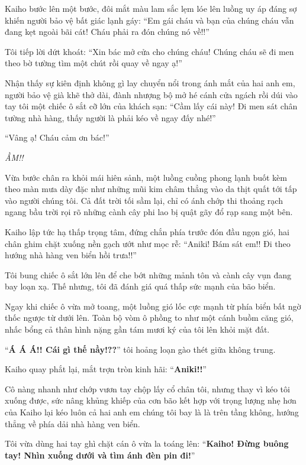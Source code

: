 \documentclass[../main.tex]{subfiles}
\begin{document}
Kaiho bước lên một bước, đôi mắt màu lam sắc lẹm lóe lên luồng uy áp đáng sợ khiến người bảo vệ bất giác lạnh gáy: ``Em gái cháu và bạn của chúng cháu vẫn đang kẹt ngoài bãi cát! Cháu phải ra đón chúng nó về!!''

Tôi tiếp lời dứt khoát: ``Xin bác mở cửa cho chúng cháu! Chúng cháu sẽ đi men theo bờ tường tìm một chút rồi quay về ngay ạ!''

Nhận thấy sự kiên định không gì lay chuyển nổi trong ánh mắt của hai anh em, người bảo vệ già khẽ thở dài, đành nhượng bộ mở hé cánh cửa ngách rồi dúi vào tay tôi một chiếc ô sắt cỡ lớn của khách sạn: ``Cầm lấy cái này! Đi men sát chân tường nhà hàng, thấy người là phải kéo về ngay đấy nhé!''

``Vâng ạ! Cháu cảm ơn bác!''

\textit{ẦM!!}

Vừa bước chân ra khỏi mái hiên sảnh, một luồng cuồng phong lạnh buốt kèm theo màn mưa dày đặc như những mũi kim châm thẳng vào da thịt quất tới tấp vào người chúng tôi. Cả đất trời tối sầm lại, chỉ có ánh chớp thi thoảng rạch ngang bầu trời rọi rõ những cành cây phi lao bị quật gãy đổ rạp sang một bên.

Kaiho lập tức hạ thấp trọng tâm, đứng chắn phía trước đón đầu ngọn gió, hai chân ghim chặt xuống nền gạch ướt như mọc rễ: ``Aniki! Bám sát em!! Đi theo hướng nhà hàng ven biển hồi trưa!!''

Tôi bung chiếc ô sắt lớn lên để che bớt những mảnh tôn và cành cây vụn đang bay loạn xạ. Thế nhưng, tôi đã đánh giá quá thấp sức mạnh của bão biển.

Ngay khi chiếc ô vừa mở toang, một luồng gió lốc cực mạnh từ phía biển bất ngờ thốc ngược từ dưới lên. Toàn bộ vòm ô phồng to như một cánh buồm căng gió, nhấc bổng cả thân hình nặng gần tám mươi ký của tôi lên khỏi mặt đất.

``\textbf{Á Á Á!! Cái gì thế nầy!??}'' tôi hoảng loạn gào thét giữa không trung.

Kaiho quay phắt lại, mắt trợn tròn kinh hãi: ``\textbf{Aniki!!}''

Cô nàng nhanh như chớp vươn tay chộp lấy cổ chân tôi, nhưng thay vì kéo tôi xuống được, sức nâng khủng khiếp của cơn bão kết hợp với trọng lượng nhẹ hơn của Kaiho lại kéo luôn cả hai anh em chúng tôi bay là là trên tầng không, hướng thẳng về phía dải nhà hàng ven biển.

Tôi vừa dùng hai tay ghì chặt cán ô vừa la toáng lên: ``\textbf{Kaiho! Đừng buông tay! Nhìn xuống dưới và tìm ánh đèn pin đi!}''
\end{document}
